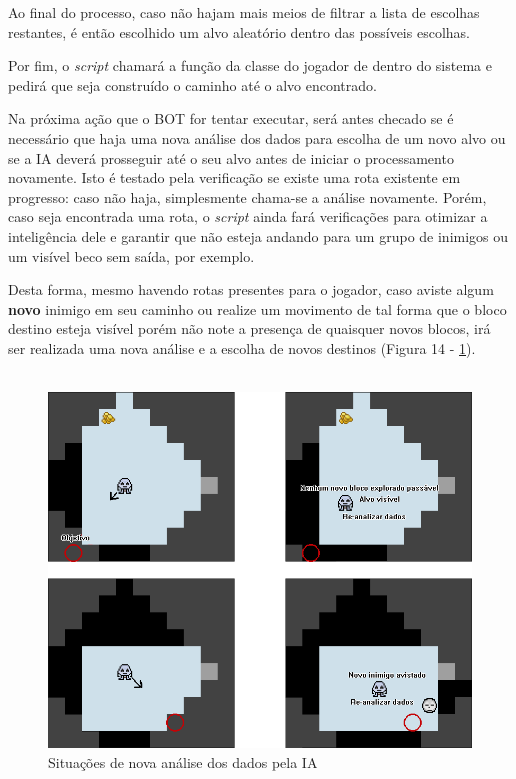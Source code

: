 Ao final do processo, caso não hajam mais meios de filtrar a lista de escolhas restantes, é então escolhido um alvo aleatório dentro das possíveis escolhas.

Por fim, o \textit{script} chamará a função da classe do jogador de dentro do sistema e pedirá que seja construído o caminho até o alvo encontrado. 

Na próxima ação que o BOT for tentar executar, será antes checado se é necessário que haja uma nova análise dos dados para escolha de um novo alvo ou se a IA deverá prosseguir até o seu alvo antes de iniciar o processamento novamente. Isto é testado pela verificação se existe uma rota existente em progresso: caso não haja, simplesmente chama-se a análise novamente.
Porém, caso seja encontrada uma rota, o \textit{script} ainda fará verificações para otimizar a inteligência dele e garantir que não esteja andando para um grupo de inimigos ou um visível beco sem saída, por exemplo.

Desta forma, mesmo havendo rotas presentes para o jogador, caso aviste algum \textbf{novo} inimigo em seu caminho ou realize um movimento de tal forma que o bloco destino esteja visível porém não note a presença de quaisquer novos blocos, irá ser realizada uma nova análise e a escolha de novos destinos (Figura 14 - \ref{fig14}). 
\\\\
\begin{figure}[h]
	\centering
	\label{fig14}
		\includegraphics[keepaspectratio=true,scale=0.5]{figuras/fig14-bot3.png}
	\caption{Situações de nova análise dos dados pela IA}
\end{figure}


